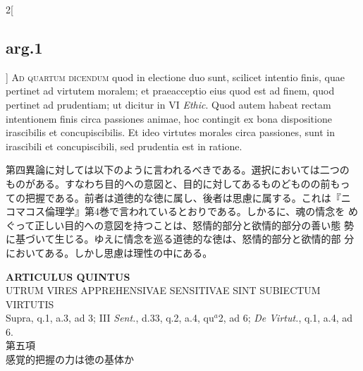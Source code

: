 \documentclass[paper=a4paper,fontsize=10pt,jafontsize=9pt,titlepage]{jlreq}
\begin{document}
\begin{paracol}{2}[\subsection{arg.1}]
{\scshape Ad quartum dicendum} quod in electione duo sunt, scilicet
intentio finis, quae pertinet ad virtutem moralem; et praeacceptio
eius quod est ad finem, quod pertinet ad prudentiam; ut dicitur in VI
{\itshape Ethic}. Quod autem habeat rectam intentionem finis circa
passiones animae, hoc contingit ex bona dispositione irascibilis et
concupiscibilis. Et ideo virtutes morales circa passiones, sunt in
irascibili et concupiscibili, sed prudentia est in ratione.

\switchcolumn

第四異論に対しては以下のように言われるべきである。選択においては二つの
ものがある。すなわち目的への意図と、目的に対してあるものどものの前もっ
ての把握である。前者は道徳的な徳に属し、後者は思慮に属する。これは『ニ
コマコス倫理学』第4巻で言われているとおりである。しかるに、魂の情念を
めぐって正しい目的への意図を持つことは、怒情的部分と欲情的部分の善い態
勢に基づいて生じる。ゆえに情念を巡る道徳的な徳は、怒情的部分と欲情的部
分においてある。しかし思慮は理性の中にある。

\end{paracol}
\newpage
{}
{}
\setcounter{section}{5}
\setcounter{subsection}{0}


\begin{center}
{\Large {\bfseries ARTICULUS QUINTUS}}\\
{\large UTRUM VIRES APPREHENSIVAE SENSITIVAE SINT SUBIECTUM VIRTUTIS}\\
{\footnotesize Supra, q.1, a.3, ad 3; III {\itshape Sent.}, d.33, q.2, a.4, qu$^{a}$2, ad 6; {\itshape De Virtut.}, q.1, a.4, ad 6.}\\
{\Large 第五項\\感覚的把握の力は徳の基体か}
\end{center}
\end{document}
